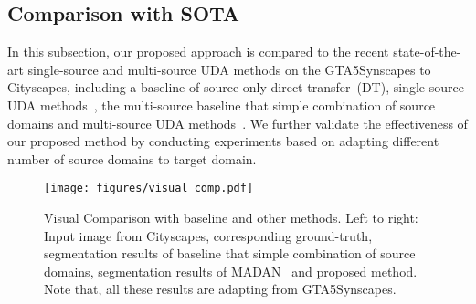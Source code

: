 \documentclass[final]{cvpr}
\begin{document}
\subsection{Comparison with SOTA}

In this subsection, our proposed approach is compared to the recent state-of-the-art single-source and multi-source UDA methods on the GTA5Synscapes to Cityscapes, including a baseline of source-only direct transfer~(DT), single-source UDA methods~\cite{tsai2018learning,pan2020unsupervised,vu2019advent,Lian_2019_ICCV,li2019bidirectional,FDA_Yang_2020_CVPR,lv2020spygr}, the multi-source baseline that simple combination of source domains and multi-source UDA methods~\cite{zhao2018adversarial,zhao2019multi}. We further validate the effectiveness of our proposed method by conducting experiments based on adapting different number of source domains to target domain.

\begin{figure}[t]
	\begin{center}
\texttt{[image: figures/visual\_comp.pdf]}
	\end{center}\vspace{-10pt}
	\caption{Visual Comparison with baseline and other methods. Left to right: Input image from Cityscapes, corresponding ground-truth, segmentation results of baseline that simple combination of source domains, segmentation results of MADAN~\cite{zhao2019multi} and proposed method. Note that, all these results are adapting from GTA5Synscapes.}
	\label{fig:qualitative_comp}
	\vspace{-10pt}
\end{figure}
\end{document}
